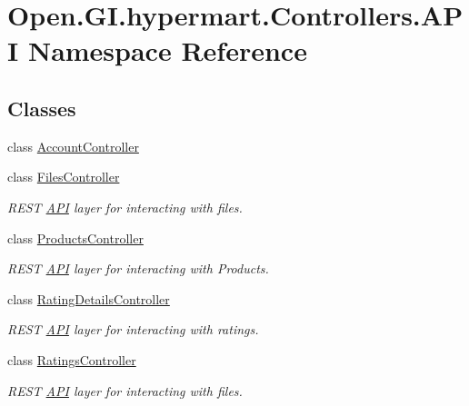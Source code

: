 \hypertarget{namespace_open_1_1_g_i_1_1hypermart_1_1_controllers_1_1_a_p_i}{}\section{Open.\+G\+I.\+hypermart.\+Controllers.\+A\+PI Namespace Reference}
\label{namespace_open_1_1_g_i_1_1hypermart_1_1_controllers_1_1_a_p_i}
\subsection*{Classes}
\begin{DoxyCompactItemize}
\item 
class \hyperlink{class_open_1_1_g_i_1_1hypermart_1_1_controllers_1_1_a_p_i_1_1_account_controller}{Account\+Controller}
\item 
class \hyperlink{class_open_1_1_g_i_1_1hypermart_1_1_controllers_1_1_a_p_i_1_1_files_controller}{Files\+Controller}
\begin{DoxyCompactList}\small\item\em R\+E\+ST \hyperlink{namespace_open_1_1_g_i_1_1hypermart_1_1_controllers_1_1_a_p_i}{A\+PI} layer for interacting with files. \end{DoxyCompactList}\item 
class \hyperlink{class_open_1_1_g_i_1_1hypermart_1_1_controllers_1_1_a_p_i_1_1_products_controller}{Products\+Controller}
\begin{DoxyCompactList}\small\item\em R\+E\+ST \hyperlink{namespace_open_1_1_g_i_1_1hypermart_1_1_controllers_1_1_a_p_i}{A\+PI} layer for interacting with Products. \end{DoxyCompactList}\item 
class \hyperlink{class_open_1_1_g_i_1_1hypermart_1_1_controllers_1_1_a_p_i_1_1_rating_details_controller}{Rating\+Details\+Controller}
\begin{DoxyCompactList}\small\item\em R\+E\+ST \hyperlink{namespace_open_1_1_g_i_1_1hypermart_1_1_controllers_1_1_a_p_i}{A\+PI} layer for interacting with ratings. \end{DoxyCompactList}\item 
class \hyperlink{class_open_1_1_g_i_1_1hypermart_1_1_controllers_1_1_a_p_i_1_1_ratings_controller}{Ratings\+Controller}
\begin{DoxyCompactList}\small\item\em R\+E\+ST \hyperlink{namespace_open_1_1_g_i_1_1hypermart_1_1_controllers_1_1_a_p_i}{A\+PI} layer for interacting with files. \end{DoxyCompactList}\item 

\end{DoxyCompactItemize}
